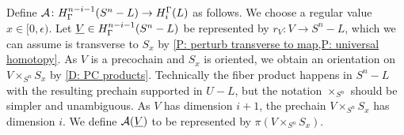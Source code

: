\begin{comment}
	Recall that we assume the components $L_i$ of $L$ have pairwise disjoint tubular neighborhoods $U_i$.
	We identify these neighborhoods with normal bundles that we may further assume have been given smooth Riemannian bundle metrics.
	This allows us to identify sphere bundles $S_a$ and the disk bundles $D_a$ consisting respectively of the elements of length $a$ or $\leq a$ in each Euclidean fiber.
	Identifying the normal bundles with $U_i$, we think of the $S_a$ as smooth $n-1$ dimensional submanifolds of $S^n$ and of the $D_a$ as smooth $n$-dimensional submanifolds with boundary.
	We can take $D_a$ to be oriented consistently with $S^n$ and let $S_a$ have the boundary orientation.

	We next construct a locally collapsing map near $L$.
	Let $\eta \colon [0,\infty) \to [0,\infty)$ be a smooth map that
	\begin{itemize}
		\item $\eta([0,1]) = 0$,
		\item $\eta$ is strictly increasing on $[1,2]$, and
		\item $\eta(x)=x$ for $x \geq 2$.
	\end{itemize}
	We then define $\rho \colon S^n \to S^n$ such that
	\begin{itemize}
		\item $\rho(x) = x$ if $x \in S^n - (\sqcup U_i)$,x
		\item $\rho(x) = \eta(d(x))x$ if $x \in \sqcup U_i$, where $d(x)$ is the distance from the origin in the fiber of the bundle $U_i$ containing $x$, and $\eta(d(x))x$ is similarly the scalar multiplication in the fiber.
	\end{itemize}
	By construction, $\rho$ is the identity map outside of $\sqcup U_i$, it is a diffeomorphism from $S^n-D_1$ onto $S^n-L$, and it retracts $D_1$ onto $L$ by the bundle projection.
\end{comment}


Define $\mathcal{A} \colon H^{n-i-1}_\Gamma(S^n-L) \to H_i^\Gamma(L)$ as follows.
We choose a regular value $x \in [0,\epsilon)$.
Let $\underline{V} \in H^{n-i-1}_\Gamma(S^n-L)$ be represented by $r_V \colon V \to S^n - L$, which we can assume is transverse to $S_x$ by \cref{P: perturb transverse to map,P: universal homotopy}.
As $V$ is a precochain and $S_x$ is oriented, we obtain an orientation on $V \times_{S^n} S_x$ by \cref{D: PC products}.
Technically the fiber product happens in $S^n-L$ with the resulting prechain supported in $U-L$, but the notation $\times_{S^n}$ should be simpler and unambiguous.
As $V$ has dimension $i+1$, the prechain $V \times_{S^n} S_x$ has dimension $i$.
We define $\mathcal{A}(\underline{V})$ to be represented by $\pi(V \times_{S^n} S_x)$.



